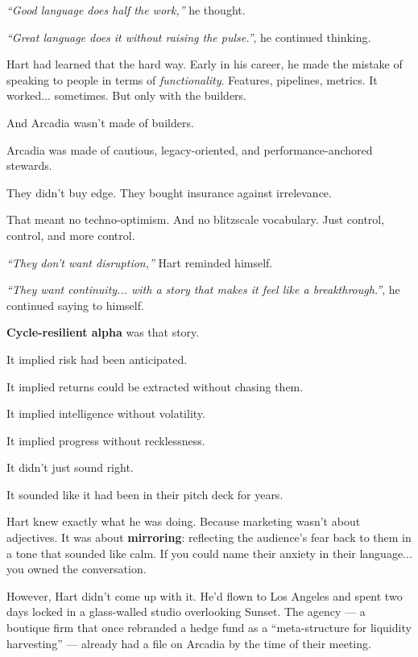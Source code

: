 \textit{“Good language does half the work,”} he thought.  

\textit{“Great language does it without raising the pulse.”}, he continued thinking.

Hart had learned that the hard way.  
Early in his career, he made the mistake of speaking to people in terms of \textit{functionality}.  
Features, pipelines, metrics. It worked... sometimes.  
But only with the builders.

And Arcadia wasn’t made of builders.  

Arcadia was made of cautious, legacy-oriented, and performance-anchored stewards.  

They didn’t buy edge.  They bought insurance against irrelevance.

That meant no techno-optimism. And no blitzscale vocabulary.  
Just control, control, and more control.

\textit{“They don’t want disruption,”} Hart reminded himself. 

\textit{“They want continuity... with a story that makes it feel like a breakthrough.”}, he continued saying to himself.

\textbf{Cycle-resilient alpha} was that story.

It implied risk had been anticipated.  

It implied returns could be extracted without chasing them.  

It implied intelligence without volatility. 

It implied progress without recklessness.

It didn’t just sound right. 

It sounded like it had been in their pitch deck for years.

Hart knew exactly what he was doing.  
Because marketing wasn’t about adjectives.  
It was about \textbf{mirroring}: reflecting the audience’s fear back to them in a tone that sounded like calm.  
If you could name their anxiety in their language...  
you owned the conversation.

However, Hart didn’t come up with it.
He’d flown to Los Angeles and spent two days locked in a glass-walled studio overlooking Sunset.
The agency — a boutique firm that once rebranded a hedge fund as a “meta-structure for liquidity harvesting” — already 
had a file on Arcadia by the time of their meeting.

